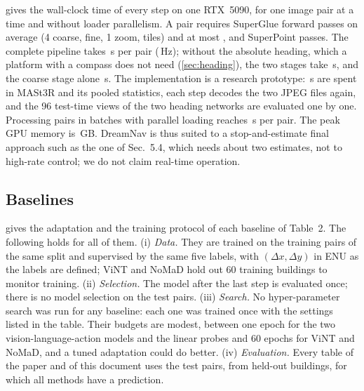  gives the wall-clock time of every step on one RTX~5090, for one image pair at a time and without loader parallelism. A pair requires \rtSG{} SuperGlue forward passes on average (4 coarse, \rtFine{} fine, 1 zoom, \rtTiles{} tiles) and at most \rtSGmax, and \rtSP{} SuperPoint passes. The complete pipeline takes \rtTotal\,s per pair (\rtHz\,Hz); without the absolute heading, which a platform with a compass does not need (\cref{sec:heading}), the two stages take \rtBoth\,s, and the coarse stage alone \rtStageOne\,s. The implementation is a research prototype: \rtMast\,s are spent in MASt3R and its pooled statistics, each step decodes the two JPEG files again, and the 96 test-time views of the two heading networks are evaluated one by one. Processing pairs in batches with parallel loading reaches \rtBatch\,s per pair. The peak GPU memory is \rtMem\,GB. DreamNav is thus suited to a stop-and-estimate final approach such as the one of Sec.~5.4, which needs about two estimates, not to high-rate control; we do not claim real-time operation.

\subsection{Baselines}
\label{sec:baselines}



 gives the adaptation and the training protocol of each baseline of Table~2. The following holds for all of them. (i) \emph{Data.} They are trained on the training pairs of the same split and supervised by the same five labels, with $(\Delta x,\Delta y)$ in ENU as the labels are defined; ViNT and NoMaD hold out 60 training buildings to monitor training. (ii) \emph{Selection.} The model after the last step is evaluated once; there is no model selection on the test pairs. (iii) \emph{Search.} No hyper-parameter search was run for any baseline: each one was trained once with the settings listed in the table. Their budgets are modest, between one epoch for the two vision-language-action models and the linear probes and 60 epochs for ViNT and NoMaD, and a tuned adaptation could do better. (iv) \emph{Evaluation.} Every table of the paper and of this document uses the \nTest{} test pairs, from \nBuildings{} held-out buildings, for which all methods have a prediction.


